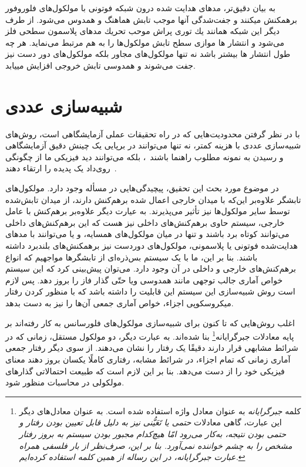 به بیان  دقیق‌تر، مدهای هدایت شده درون شبكه فوتونی با مولكول‌های فلوروفور برهمكنش میكنند و جفت‌شدگی آنها موجب تابش هماهنگ و همدوس می‌‌شود. از طرف دیگر این شبكه همانند یك توری پراش موحب تحریك مدهای پلاسمون سطحی فلز می‌شود و انتشار ها موازی سطح تابش مولكول‌ها را به هم مرتبط می‌نماید. هر چه طول انتشار ها بیشتر باشد نه تنها مولكول‌های مجاور بلكه مولكول‌های دور دست نیز جفت می‌شوند و همدوسی تابش خروجی افزایش مییابد.

\section{شبیه‌سازی عددی}
با در نظر گرفتن محدودیت‌هایی که در راه تحقیقات عملی آزمایشگاهی است، روش‌های شبیه‌سازی عددی با هزینه کمتر، نه  تنها می‌توانند در برپایی یک چینش دقیق آزمایشگاهی و رسیدن به نمونه مطلوب راهنما باشند~\cite{Bradford:14,Lee:18}، بلکه می‌توانند دید فیزیکی ما از چگونگی روی‌داد یک پدیده را ارتقاء دهند~\cite{cao2000transition,PhysRevE.98.063304}.

در موضوع مورد بحث این تحقیق، پیچیدگی‌هایی  در مسأله وجود دارد. مولکول‌های تابشگر علاوه‌بر این‌که با میدان خارجی اعمال شده برهم‌کنش دارند، از میدان تابش‌شده توسط سایر مولکول‌ها نیز تأثیر 
می‌پذیرند. به عیارت دیگر علاوه‌بر برهم‌کنش با عامل خارجی، سیستم حاوی برهم‌کنش‌های داخلی نیز هست که این برهم‌کنش‌های داخلی می‌توانند کوتاه برد باشند و تنها در میان مولکول‌های همسایه، و یا می‌توانند با مدهای هدایت‌شده فوتونی یا پلاسمونی، مولکول‌های دوردست نیز برهمکنش‌های بلندبرد داشته باشند. بنا بر این، ما با یک سیستم بس‌ذره‌ای از تابشگرها مواجهیم که انواع برهم‌کنش‌های خارجی و داخلی در آن وجود دارد. می‌توان پیش‌بینی کرد که این سیستم خواص آماری جالب توجهی مانند همدوسی ویا حتّی گذار فاز را بروز دهد. پس لازم است روش شبیه‌سازی این سیستم این قابلیت را داشته باشد که با منظور کردن رفتار میکروسکوپی اجزاء، خواص آماری جمعی آن‌ها را نیز به دست بدهد.

اغلب روش‌هایی که تا کنون برای شبیه‌سازی مولکول‌های فلورسانس به کار رفته‌اند بر پایه معادلات جبرگرایانه\footnote{کلمه \emph{جبرگرایانه} به عنوان معادل واژه  استفاده شده است. به عنوان معادل‌های دیگر این عبارت، گاهی معادلات \it{حتمی} یا \emph{تَعَیُّنی} نیز به دلیل قابل تعیین بودن رفتار و حتمی بودن نتیجه، به‌کار می‌رود امّا هیچ‌کدام مجبور بودن سیستم به بروز رفتار مشخص را به چشم خواننده نمی‌آورد. بنا بر این، صرف‌نظر از بار فلسفی همراه عبارت \emph{جبرگرایانه}، در این رساله از همین کلمه استفاده کرده‌ایم. } بنا شده‌اند. به عبارت دیگر، دو مولکول مستقل، زمانی که در شرائط مشابهی قرار دارند دقیقًا یک رفتار را نشان می‌دهند. از سوی دیگر رفتار جمعی آماری زمانی که تمام اجزاء، در شرائط مشابه، رفتاری کاملًا یکسان بروز دهند معنای فیزیکی خود را از دست می‌دهد. بنا بر این لازم است که طبیعت احتمالاتی گذارهای مولکولی در محاسبات منظور شود.

